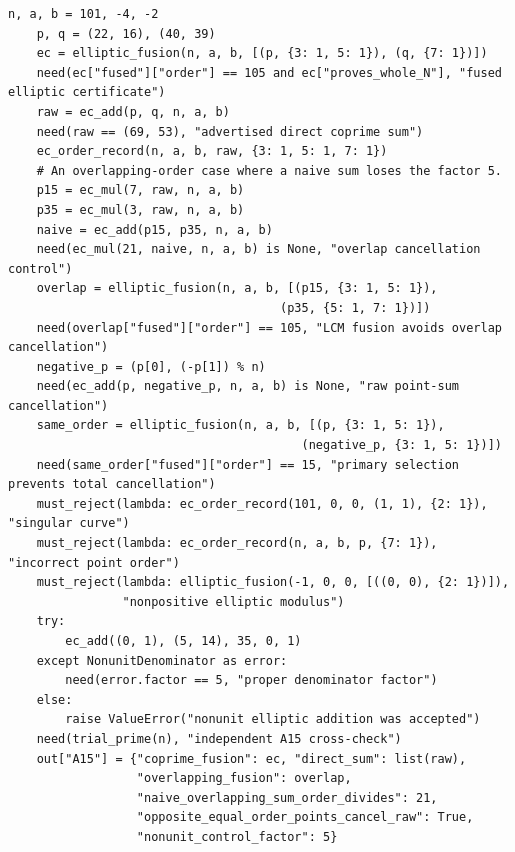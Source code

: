 \documentclass[11pt,a4paper]{article}
\theoremstyle{definition}\newtheorem{definition}[theorem]{Definition}
\theoremstyle{remark}\newtheorem{remark}[theorem]{Remark}
\begin{document}
\begin{lstlisting}[label=lst:certificates]
    n, a, b = 101, -4, -2
    p, q = (22, 16), (40, 39)
    ec = elliptic_fusion(n, a, b, [(p, {3: 1, 5: 1}), (q, {7: 1})])
    need(ec["fused"]["order"] == 105 and ec["proves_whole_N"], "fused elliptic certificate")
    raw = ec_add(p, q, n, a, b)
    need(raw == (69, 53), "advertised direct coprime sum")
    ec_order_record(n, a, b, raw, {3: 1, 5: 1, 7: 1})
    # An overlapping-order case where a naive sum loses the factor 5.
    p15 = ec_mul(7, raw, n, a, b)
    p35 = ec_mul(3, raw, n, a, b)
    naive = ec_add(p15, p35, n, a, b)
    need(ec_mul(21, naive, n, a, b) is None, "overlap cancellation control")
    overlap = elliptic_fusion(n, a, b, [(p15, {3: 1, 5: 1}),
                                      (p35, {5: 1, 7: 1})])
    need(overlap["fused"]["order"] == 105, "LCM fusion avoids overlap cancellation")
    negative_p = (p[0], (-p[1]) % n)
    need(ec_add(p, negative_p, n, a, b) is None, "raw point-sum cancellation")
    same_order = elliptic_fusion(n, a, b, [(p, {3: 1, 5: 1}),
                                         (negative_p, {3: 1, 5: 1})])
    need(same_order["fused"]["order"] == 15, "primary selection prevents total cancellation")
    must_reject(lambda: ec_order_record(101, 0, 0, (1, 1), {2: 1}), "singular curve")
    must_reject(lambda: ec_order_record(n, a, b, p, {7: 1}), "incorrect point order")
    must_reject(lambda: elliptic_fusion(-1, 0, 0, [((0, 0), {2: 1})]),
                "nonpositive elliptic modulus")
    try:
        ec_add((0, 1), (5, 14), 35, 0, 1)
    except NonunitDenominator as error:
        need(error.factor == 5, "proper denominator factor")
    else:
        raise ValueError("nonunit elliptic addition was accepted")
    need(trial_prime(n), "independent A15 cross-check")
    out["A15"] = {"coprime_fusion": ec, "direct_sum": list(raw),
                  "overlapping_fusion": overlap,
                  "naive_overlapping_sum_order_divides": 21,
                  "opposite_equal_order_points_cancel_raw": True,
                  "nonunit_control_factor": 5}


\end{lstlisting}
\end{document}
